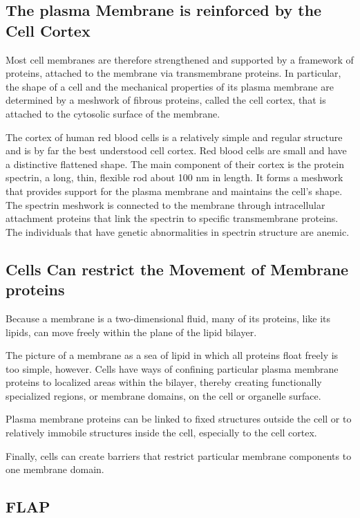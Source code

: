\subsection{The plasma Membrane is reinforced by the Cell Cortex}

Most cell membranes are therefore strengthened
and supported by a framework of proteins, attached to the membrane
via transmembrane proteins. In particular, the shape of a cell and the
mechanical properties of its plasma membrane are determined by a
meshwork of fibrous proteins, called the cell cortex, that is attached to the
cytosolic surface of the membrane.

The cortex of human red blood cells is a relatively simple and regular
structure and is by far the best understood cell cortex. Red blood cells
are small and have a distinctive flattened shape.
The main
component of their cortex is the protein spectrin, a long, thin, flexible
rod about 100 nm in length. It forms a meshwork that provides support
for the plasma membrane and maintains the cell’s shape. The spectrin
meshwork is connected to the membrane through intracellular attachment 
proteins that link the spectrin to specific transmembrane proteins.
The individuals that have genetic abnormalities in spectrin structure are anemic.

\subsection{Cells Can restrict the Movement of Membrane proteins}

Because a membrane is a two-dimensional fluid, many of its proteins, like
its lipids, can move freely within the plane of the lipid bilayer.

The picture of a membrane as a sea of lipid in which all proteins float
freely is too simple, however. Cells have ways of confining particular
plasma membrane proteins to localized areas within the bilayer, thereby
creating functionally specialized regions, or membrane domains, on the
cell or organelle surface.

Plasma membrane proteins can be linked to fixed structures outside the cell
or to relatively immobile structures inside the cell, especially to the cell cortex.

Finally, cells can create barriers that restrict particular membrane components 
to one membrane domain.

\subsection{FLAP}

